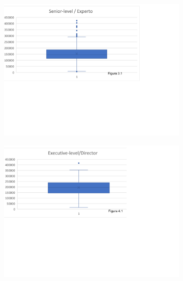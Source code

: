 \documentclass{article}
\begin{document}
	\begin{figure}[htbp]
		\begin{subfigure}[b]{1.1\textwidth}
			\includegraphics[width=\textwidth]{FigurasTablas/figura3.1diagrama.png}
			\label{figura 3.1 diagrama}
		\end{subfigure}	
		
		\begin{subfigure}[b]{1.1\textwidth}
			\includegraphics[width=\textwidth]{FigurasTablas/figura4.1diagrama.png}
			\label{figura 4.1 diagrama}
		\end{subfigure}	
	\end{figure}
\end{document}

